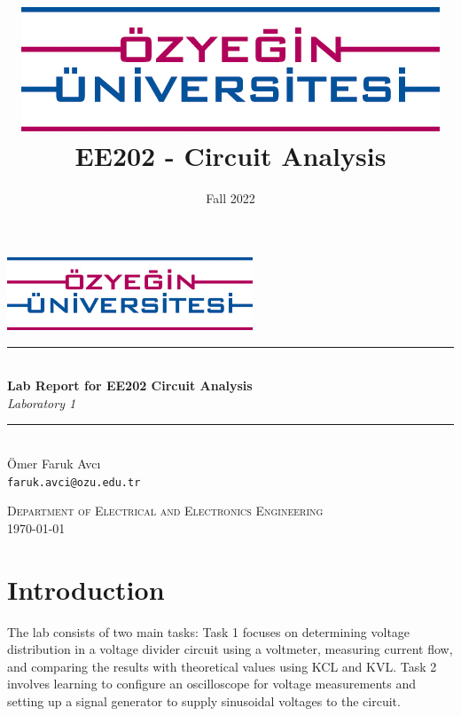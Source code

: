 \documentclass{article}
\title{\includegraphics[scale=0.65]{images/ozu.png}\\
\textbf{EE202 - Circuit Analysis}}
\subtitle{Laboratory #4}
\date{Fall 2022}
\newcommand{\HRule}{\rule{\linewidth}{0.5mm}}
\begin{document}
\begin{titlepage}
\begin{center}

\includegraphics[width=0.55\textwidth]{ozu.png}~\\[2cm]

\HRule \\[0.4cm]
{ \LARGE 
  \textbf{Lab Report for EE202 Circuit Analysis}\\[0.4cm]
  \emph{Laboratory 1}\\[0.4cm]
}
\HRule \\[1.5cm]

{ \large
  Ömer Faruk Avcı \\[0.1cm]
  \texttt{faruk.avci@ozu.edu.tr}
}

\vfill

\textsc{\large Department of Electrical and Electronics Engineering}\\[0.4cm]


{\large \today}
 
\end{center}
\end{titlepage}



\newpage


\section{Introduction}
The lab consists of two main tasks: Task 1 focuses on determining voltage distribution in a voltage divider circuit using a voltmeter, measuring current flow, and comparing the results with theoretical values using KCL and KVL. Task 2 involves learning to configure an oscilloscope for voltage measurements and setting up a signal generator to supply sinusoidal voltages to the circuit.
\end{document}
